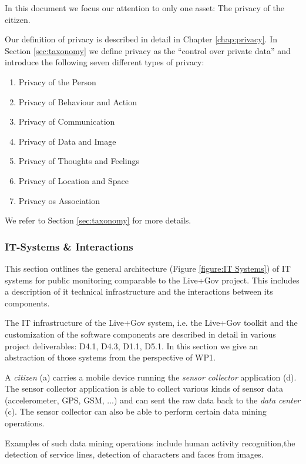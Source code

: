 In this document we focus our attention to only one asset: The privacy of the citizen.

Our definition of privacy is described in detail in Chapter \ref{chap:privacy}. In Section \ref{sec:taxonomy} we define privacy as the ``control over private data'' and introduce the following seven different types of privacy:
\begin{enumerate}
\item Privacy of the Person
\item Privacy of Behaviour and Action
\item Privacy of Communication
\item Privacy of Data and Image
\item Privacy of Thoughts and Feelings
\item Privacy of Location and Space
\item Privacy os Association
\end{enumerate}

We refer to Section \ref{sec:taxonomy} for more details.

\subsubsection{IT-Systems \& Interactions}
\label{subsubsection:it-systems}

This section outlines the general architecture (Figure \ref{figure:IT Systems}) of IT systems for public monitoring comparable to the Live+Gov project.
This includes a description of it technical infrastructure and the interactions between its components.

The IT infrastructure of the Live+Gov system, i.e. the Live+Gov toolkit and the customization of the software components are described in detail in various project deliverables: D4.1, D4.3, D1.1, D5.1.
In this section we give an abstraction of those systems from the perspective of WP1.



A \emph{citizen} (a) carries a mobile device running the \emph{sensor collector} application (d).
The sensor collector application is able to collect various kinds of sensor data (accelerometer, GPS, GSM, ...) and can sent the raw data back to the \emph{data center} (c).
The sensor collector can also be able to perform certain data mining operations.

Examples of such data mining operations include human activity recognition,the detection of service lines, detection of characters and faces from images.

